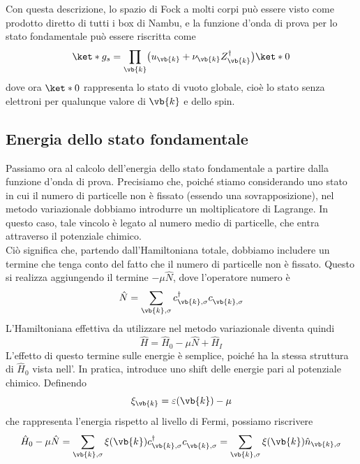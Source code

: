 Con questa descrizione, lo spazio di Fock a molti corpi può essere visto come prodotto diretto di tutti i box di Nambu, e la funzione d'onda di prova per lo stato fondamentale può essere riscritta come
\begin{equation}
   \ket*{g_s}
   =\prod_{\vb{k}} \bigl( u_{\vb{k}} + \nu_{\vb{k}} Z^{\dag}_{\vb{k}} \bigr) \ket*{0}
   \label{eq:BCS_trial_wavefunction_Nambu}
\end{equation}
dove ora $\ket*{0}$ rappresenta lo stato di vuoto globale, cioè lo stato senza elettroni per qualunque valore di $\vb{k}$ e dello spin.
\subsection{Energia dello stato fondamentale}
Passiamo ora al calcolo dell'energia dello stato fondamentale a partire dalla funzione d'onda di prova. Precisiamo che, poiché stiamo considerando uno stato in cui il numero di particelle non è fissato (essendo una sovrapposizione), nel metodo variazionale dobbiamo introdurre un moltiplicatore di Lagrange. In questo caso, tale vincolo è legato al numero medio di particelle, che entra attraverso il potenziale chimico.\\
Ciò significa che, partendo dall'Hamiltoniana totale, dobbiamo includere un termine che tenga conto del fatto che il numero di particelle non è fissato. Questo si realizza aggiungendo il termine $-\mu \hat{N}$, dove l'operatore numero è
\begin{equation*}
   \hat{N}
   =\sum_{\vb{k},\sigma} c^{\dag}_{\vb{k},\sigma} c^{\vphantom{\dag}}_{\vb{k},\sigma}
\end{equation*}
L'Hamiltoniana effettiva da utilizzare nel metodo variazionale diventa quindi
\begin{equation*}
   \hat{H}=\hat{H}_0 - \mu \hat{N} + \hat{H}_I
\end{equation*}
L'effetto di questo termine sulle energie è semplice, poiché ha la stessa struttura di $\hat{H}_0$ vista nell'. In pratica, introduce uno shift delle energie pari al potenziale chimico. Definendo
\begin{equation*}
   \xi_{\vb{k}}
   =\varepsilon(\vb{k}) - \mu
\end{equation*}
che rappresenta l'energia rispetto al livello di Fermi, possiamo riscrivere
\begin{equation*}
   \hat{H}_0 - \mu \hat{N}
   =\sum_{\vb{k},\sigma} \xi(\vb{k}) c^{\dag}_{\vb{k},\sigma} c^{\vphantom{\dag}}_{\vb{k},\sigma}
   =\sum_{\vb{k},\sigma} \xi(\vb{k}) \hat{n}_{\vb{k},\sigma}
\end{equation*}
